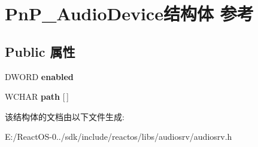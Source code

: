 \hypertarget{struct_pn_p___audio_device}{}\section{Pn\+P\+\_\+\+Audio\+Device结构体 参考}
\label{struct_pn_p___audio_device}
\subsection*{Public 属性}
\begin{DoxyCompactItemize}
\item 
\mbox{\label{struct_pn_p___audio_device_a46daf63cd7bf4bc4e52d20bdcfb47f88}} 
D\+W\+O\+RD {\bfseries enabled}
\item 
\mbox{\label{struct_pn_p___audio_device_a9ec6f08edb0a57ff282f562655223be3}} 
W\+C\+H\+AR {\bfseries path} \mbox{[}$\,$\mbox{]}
\end{DoxyCompactItemize}


该结构体的文档由以下文件生成\+:\begin{DoxyCompactItemize}
\item 
E\+:/\+React\+O\+S-\/0../sdk/include/reactos/libs/audiosrv/audiosrv.\+h\end{DoxyCompactItemize}
